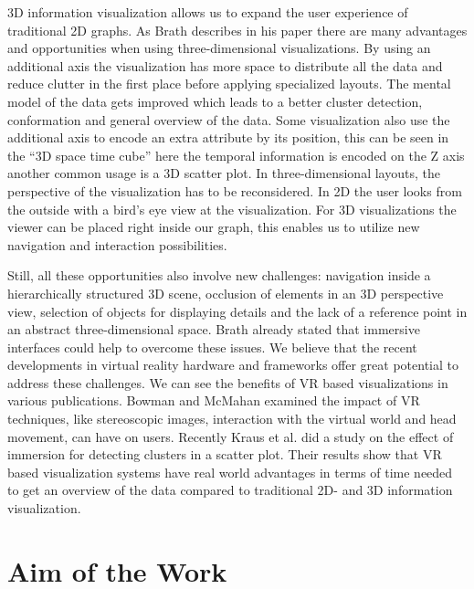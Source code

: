 3D information visualization allows us to expand the user experience of traditional 2D graphs. As Brath describes in his paper \cite{brath_3d_2014} there are many advantages and opportunities when using three-dimensional visualizations.
By using an additional axis the visualization has more space to distribute all the data and reduce clutter in the first place before applying specialized layouts. The mental model of the data gets improved which leads to a better cluster detection, conformation and general overview of the data. 
Some visualization also use the additional axis to encode an extra attribute by its position, this can be seen in the “3D space time cube” \cite{brath_3d_2014} here the temporal information is encoded on the Z axis another common usage is a 3D scatter plot.
In three-dimensional layouts, the perspective of the visualization has to be reconsidered. In 2D the user looks from the outside with a bird's eye view at the visualization. For 3D visualizations the viewer can be placed right inside our graph, this enables us to utilize new navigation and interaction possibilities.

Still, all these opportunities also involve new challenges: navigation inside a hierarchically structured 3D scene, occlusion of elements in an 3D perspective view, selection of objects for displaying details and the lack of a reference point in an abstract three-dimensional space. Brath \cite{brath_3d_2014} already stated that immersive interfaces could help to overcome these issues.\label{chap:advantages_VR}
We believe that the recent developments in virtual reality hardware and frameworks offer great potential to address these challenges. 
We can see the benefits of VR based visualizations in various publications. Bowman and McMahan \cite{bowman_virtual_2007} examined the impact of VR techniques, like stereoscopic images, interaction with the virtual world and head movement, can have on users. 
Recently Kraus et al. \cite{kraus_impact_2020} did a study on the effect of immersion for detecting clusters in a scatter plot. Their results show that VR based visualization systems have real world advantages in terms of time needed to get an overview of the data compared to traditional 2D- and 3D information visualization. 
 
\section{Aim of the Work}

